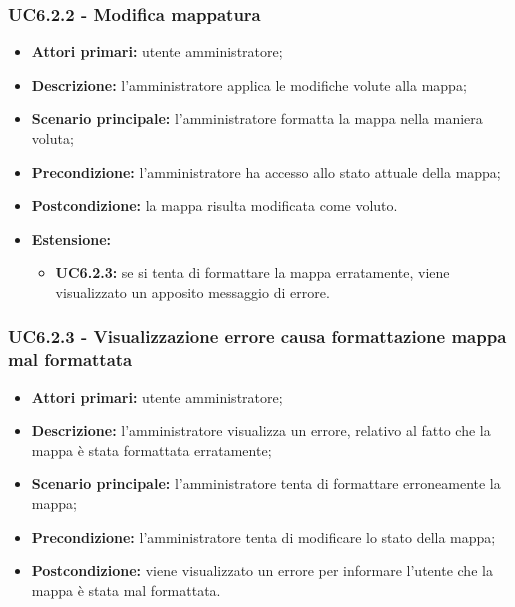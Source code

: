 	\subsubsection{UC6.2.2 - Modifica mappatura}
	\begin{itemize}
		\item \textbf{Attori primari:} utente amministratore;
		\item \textbf{Descrizione:} l'amministratore applica le modifiche volute alla mappa;
		\item \textbf{Scenario principale:} l'amministratore formatta la mappa nella maniera voluta;		
		\item \textbf{Precondizione:} l'amministratore ha accesso allo stato attuale della mappa;
		\item \textbf{Postcondizione:} la mappa risulta modificata come voluto.
		\item \textbf{Estensione:}
		\begin{itemize}
			\item \textbf{UC6.2.3:} se si tenta di formattare la mappa erratamente, viene visualizzato un apposito messaggio di errore.
		\end{itemize}
	\end{itemize}

\subsubsection{UC6.2.3 - Visualizzazione errore causa formattazione mappa mal formattata}
	\begin{itemize}
		\item \textbf{Attori primari:} utente amministratore;
		\item \textbf{Descrizione:} l'amministratore visualizza un errore, relativo al fatto che la mappa è stata formattata erratamente;
		\item \textbf{Scenario principale:} l'amministratore tenta di formattare erroneamente la mappa;
		\item \textbf{Precondizione:} l'amministratore tenta di modificare lo stato della mappa;
		\item \textbf{Postcondizione:} viene visualizzato un errore per informare l'utente che la mappa è stata mal formattata.
	\end{itemize}

